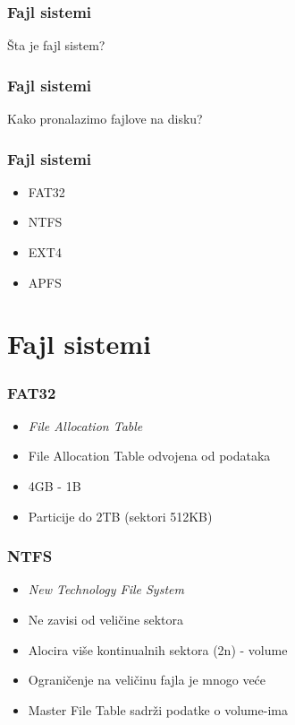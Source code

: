 \documentclass{beamer}
\begin{document}
\begin{frame}
    \frametitle{Fajl sistemi}
    \begin{center}
        Šta je fajl sistem?
    \end{center}
\end{frame}

\begin{frame}
    \frametitle{Fajl sistemi}
    \begin{center}
        Kako pronalazimo fajlove na disku?
    \end{center}

\end{frame}

\begin{frame}
    \frametitle{Fajl sistemi}
    \begin{itemize}
        \item FAT32 \newline
        \item NTFS \newline   
        \item EXT4 \newline
        \item APFS
    \end{itemize}
\end{frame}

\section*{Fajl sistemi}

\begin{frame}
    \frametitle{FAT32}
    \begin{itemize}
        \item \textit{File Allocation Table} \newline
        \item File Allocation Table odvojena od podataka \newline
        \item 4GB - 1B \newline
        \item Particije do 2TB (sektori 512KB)
    \end{itemize}
\end{frame}

\begin{frame}
    \frametitle{NTFS}
    \begin{itemize}
        \item \textit{New Technology File System} \newline
        \item Ne zavisi od veličine sektora \newline
        \item Alocira više kontinualnih sektora (2n) - volume \newline
        \item Ograničenje na veličinu fajla je mnogo veće \newline
        \item Master File Table sadrži podatke o volume-ima
    \end{itemize}
\end{frame}
\end{document}
